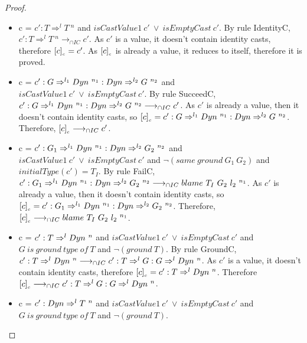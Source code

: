 \documentclass[a4paper]{article}
\begin{document}
\begin{proof}
\begin{itemize}
\begin{comment}
        Therefore, $c = \stuckcast{T_I}{T_1}{n_1} : T_1 \Rightarrow^l T_1\ ^{n_2}$.
        By rule PushStuckC, $\stuckcast{T_I}{T_1}{n_1} : T_1 \Rightarrow^l T_1\ ^{n_2} \longrightarrow_{\cap IC} \stuckcast{T_I}{T_1}{n_1}$.
        Since $\erasec{c} = \stuckcast{T_I}{T_1}{n_1}$, and it is already a value, it is proved.
    \end{itemize}
    \end{comment}
    \item c = $c' : T \Rightarrow^l T\ ^n$ and $isCastValue1\ c'\ \lor\ isEmptyCast\ c'$.
    By rule IdentityC, $c' : T \Rightarrow^l T\ ^n \longrightarrow_{\cap IC} c'$.
    As $c'$ is a value, it doesn't contain identity casts, therefore $[c]_{_c} = c'$.
    As $[c]_{_c}$ is already a value, it reduces to itself, therefore it is proved.
    \item c = $c' : G \Rightarrow^{l_1} \Dyn\ ^{n_1} : \Dyn \Rightarrow^{l_2} G\ ^{n_2}$ and $isCastValue1\ c'\ \lor\ isEmptyCast\ c'$.
    By rule SucceedC, $c' : G \Rightarrow^{l_1} Dyn\ ^{n_1} : Dyn \Rightarrow^{l_2} G\ ^{n_2} \longrightarrow_{\cap IC} c'$.
    As $c'$ is already a value, then it doesn't contain identity casts, so $[c]_{_c} = c' : G \Rightarrow^{l_1} Dyn\ ^{n_1} : Dyn \Rightarrow^{l_2} G\ ^{n_2}$.
    Therefore, $[c]_{_c} \longrightarrow_{\cap IC} c'$.
    \item c = $c' : G_1 \Rightarrow^{l_1} \Dyn\ ^{n_1} : \Dyn \Rightarrow^{l_2} G_2\ ^{n_2}$ and $isCastValue1\ c'\ \lor\ isEmptyCast\ c'$ and $\neg(same\ ground\ G_1\ G_2)$ and $initialType(c') = T_I$.
    By rule FailC, $c' : G_1 \Rightarrow^{l_1} Dyn\ ^{n_1} : Dyn \Rightarrow^{l_2} G_2\ ^{n_2} \longrightarrow_{\cap IC} blame\ T_I\ G_2\ l_2\ ^{n_1}$.
    As $c'$ is already a value, then it doesn't contain identity casts, so $\erasec{c} = c' : G_1 \Rightarrow^{l_1} \Dyn\ ^{n_1} : \Dyn \Rightarrow^{l_2} G_2\ ^{n_2}$.
    Therefore, $[c]_{_c} \longrightarrow_{\cap IC} blame\ T_I\ G_2\ l_2\ ^{n_1}$.
    \item c = $c' : T \Rightarrow^l \Dyn\ ^n$ and $isCastValue1\ c'\ \lor\ isEmptyCast\ c'$ and $G\ is\ ground\ type\ of\ T$ and $\neg(ground\ T)$.
    By rule GroundC, $c' : T \Rightarrow^l \Dyn\ ^n \longrightarrow_{\cap IC} c' : T \Rightarrow^l G : G \Rightarrow^l \Dyn\ ^n$.
    As $c'$ is a value, it doesn't contain identity casts, therefore $[c]_{_c} = c' : T \Rightarrow^l Dyn\ ^n$.
    Therefore $[c]_{_c} \longrightarrow_{\cap IC} c' : T \Rightarrow^l G : G \Rightarrow^l Dyn\ ^n$.
    \item c = $c' : \Dyn \Rightarrow^l T\ ^n$ and $isCastValue1\ c'\ \lor\ isEmptyCast\ c'$ and $G\ is\ ground\ type\ of\ T$ and $\neg(ground\ T)$.

\end{itemize}
\end{proof}
\end{document}
